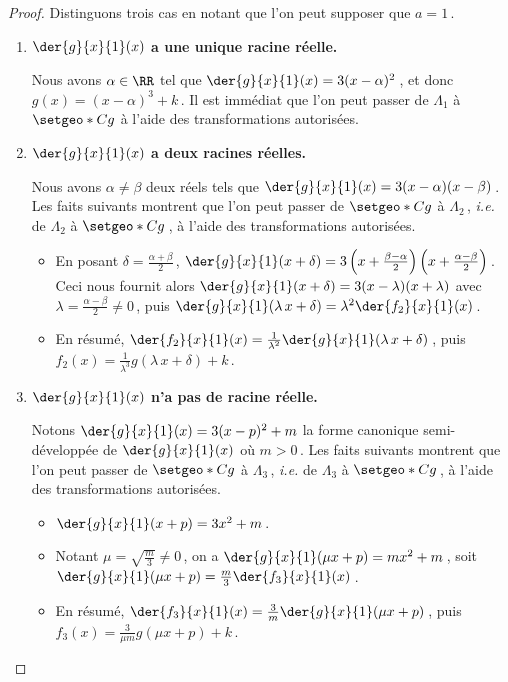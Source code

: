 \begin{proof}
	Distinguons trois cas en notant que l'on peut supposer que $a = 1$\,.
	\begin{enumerate}
		\item \textbf{$\der{g}{x}{1}(x)$ a une unique racine réelle.}

		\smallskip
		\noindent
		Nous avons $\alpha \in \RR$ tel que $\der{g}{x}{1}(x) = 3(x - \alpha)^2$\,, et donc $g(x) = (x - \alpha)^3 + k$\,.
		Il est immédiat que l'on peut passer de $\Lambda_1$ à $\setgeo*{C}{g}$ à l'aide des transformations autorisées.


		\item \textbf{$\der{g}{x}{1}(x)$ a deux racines réelles.}

		\smallskip
		\noindent
		Nous avons $\alpha \neq \beta$ deux réels tels que $\der{g}{x}{1}(x) = 3 (x - \alpha) (x - \beta)$\,.
		Les faits suivants montrent que l'on peut passer de $\setgeo*{C}{g}$ à $\Lambda_2$\,, \emph{i.e.} de $\Lambda_2$ à $\setgeo*{C}{g}$\,, à l'aide des transformations autorisées.
		\begin{itemize}
			\item En posant $\delta = \frac{\alpha + \beta}{2}$\,,
			$\der{g}{x}{1}(x + \delta) = 3 \left( x + \frac{\beta - \alpha}{2} \right) \left( x + \frac{\alpha - \beta}{2} \right)$\,.
			Ceci nous fournit alors
			$\der{g}{x}{1}(x + \delta) = 3 ( x - \lambda) (x + \lambda)$
			avec $\lambda = \frac{\alpha - \beta}{2} \neq 0$\,,
			puis
			$\der{g}{x}{1}( \lambda \, x + \delta) = \lambda^2 \der{f_2}{x}{1}(x)$\,.
			
			\item En résumé,
			$\der{f_2}{x}{1}(x) = \frac{1}{\lambda^2} \der{g}{x}{1}(\lambda \, x + \delta)$\,,
			puis
			$f_2(x) = \frac{1}{\lambda^3} g(\lambda \, x + \delta) + k$\,.
		\end{itemize}




		\item \textbf{$\der{g}{x}{1}(x)$ n'a pas de racine réelle.}

		\smallskip
		\noindent
		Notons $\der{g}{x}{1}(x) = 3(x - p)^2 + m$ la forme canonique semi-développée de $\der{g}{x}{1}(x)$ où $m > 0$\,.
		Les faits suivants montrent que l'on peut passer de $\setgeo*{C}{g}$ à $\Lambda_3$\,, \emph{i.e.} de $\Lambda_3$ à $\setgeo*{C}{g}$\,, à l'aide des transformations autorisées.
		\begin{itemize}
			\item $\der{g}{x}{1}(x + p) = 3 x^2 + m$\,.
			
			\item Notant $\mu = \sqrt{\frac{m}{3}} \neq 0$\,, on a
			$\der{g}{x}{1}(\mu x + p) = m x^2 + m$\,,
			soit
			$\der{g}{x}{1}(\mu x + p) = \frac{m}{3} \der{f_3}{x}{1}(x)$\,.
			
			\item En résumé,
			$\der{f_3}{x}{1}(x) = \frac{3}{m} \der{g}{x}{1}(\mu x + p)$\,,
			puis
			$f_3(x) = \frac{3}{\mu m} g(\mu x + p) + k$\,.
		\end{itemize}
	\end{enumerate}
\end{proof}


